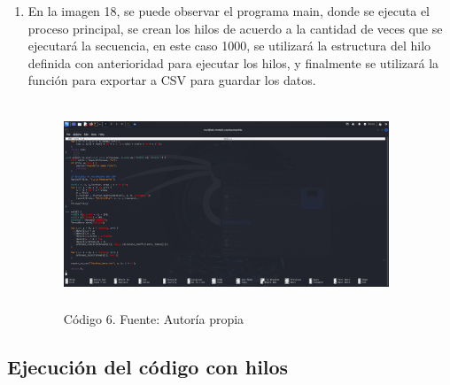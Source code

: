 \begin{enumerate}
	\item En la imagen 18, se puede observar el programa main, donde se ejecuta el proceso principal, se crean los hilos de acuerdo a la cantidad de veces que se ejecutará la secuencia, en este caso 1000, se utilizará la estructura del hilo definida con anterioridad para ejecutar los hilos, y finalmente se utilizará la función para exportar a CSV para guardar los datos.
	
	\begin{figure}[H]
		\centering
		\includegraphics[width=3.82031in,height=2.4068in]{media/image5.png}
		\caption{Código 6. Fuente: Autoría propia}
	\end{figure}
	
\end{enumerate}

\subsection{Ejecución del código con hilos}

